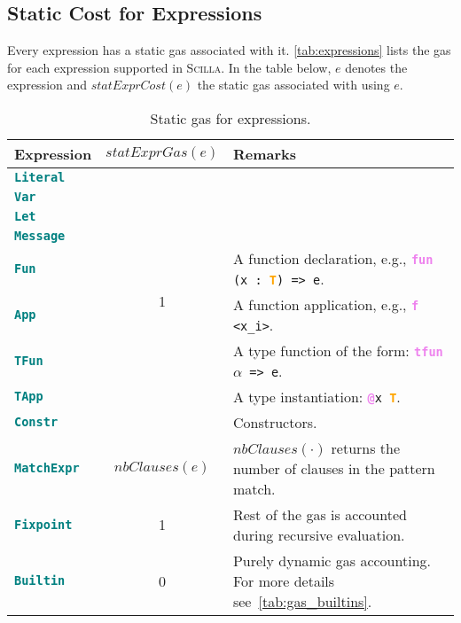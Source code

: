 \documentclass[9pt]{article}
\begin{document}
\subsection{Static Cost for Expressions}

Every expression has a static gas associated with it.
\autoref{tab:expressions} lists the gas for each expression supported in
\textsc{Scilla}. In the table below, $e$ denotes the expression and
$statExprCost(e)$ the static gas associated with using $e$.

\begin{table}[!hbt]
	\caption{Static gas for expressions. \label{tab:expressions} }
\centering
	\begin{tabular}{|l|c|p{10.0cm}|}
	\hline
		\textbf{Expression} & \textbf{$statExprGas(e)$} & \textbf{Remarks} \\ \hline
		\textbf{\texttt{\textcolor{teal}{Literal}}}  & \multirow{9}{*}{1}  & \\
		\cline{1-1} \cline{3-3}
		\textbf{\texttt{\textcolor{teal}{Var}}}  &  & \\ \cline{1-1}\cline{3-3}

		\textbf{\texttt{\textcolor{teal}{Let}}}  &  & \\ \cline{1-1}\cline{3-3}

		\textbf{\texttt{\textcolor{teal}{Message}}}  &  & \\ \cline{1-1}\cline{3-3}
		\textbf{\texttt{\textcolor{teal}{Fun}}}  &  & A function declaration, e.g., \texttt{\textbf{\textcolor{violet}{fun}} (x : \textbf{\textcolor{orange}{T}}) => e}. \\ \cline{1-1} \cline{3-3}
		\textbf{\texttt{\textcolor{teal}{App}}}  &  & A function application, e.g.,
			\texttt{\textbf{\textcolor{violet}{f}} <x\_i>}. \\ \cline{1-1}\cline{3-3}

			\textbf{\texttt{\textcolor{teal}{TFun}}}  &  & A type function of
			the form: \texttt{\textbf{\textcolor{violet}{tfun}} $\alpha$ => e}. \\ \cline{1-1}\cline{3-3}

			\textbf{\texttt{\textcolor{teal}{TApp}}}  &  & A type
			instantiation: \texttt{\textbf{\textcolor{violet}{@}}x
			\textbf{\textcolor{orange}{T}}}. \\ \cline{1-1}\cline{3-3}

			\textbf{\texttt{\textcolor{teal}{Constr}}}  &  & Constructors. \\ \hline
			\textbf{\texttt{\textcolor{teal}{MatchExpr}}}  & $nbClauses(e)$
		&$nbClauses(\cdot)$ returns the number of clauses in the pattern match.
		 \\ \hline
	   \textbf{\texttt{\textcolor{teal}{Fixpoint}}}  & 1  & Rest of the gas is
		accounted during recursive evaluation. \\ \hline
		\textbf{\texttt{\textcolor{teal}{Builtin}}}  & 0 & Purely dynamic gas
		accounting. For more details see~\autoref{tab:gas_builtins}. \\ \hline
	\end{tabular}
	\end{table}
 
\end{document}

